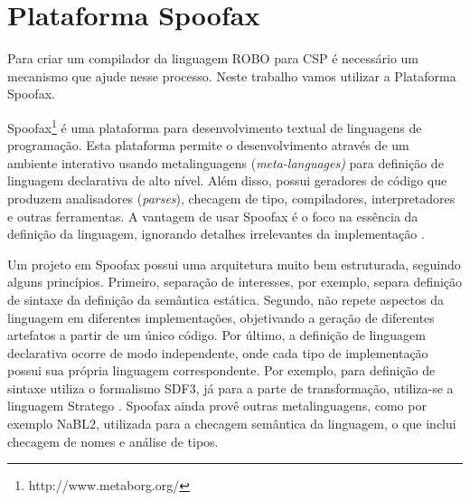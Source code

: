 


\section{Plataforma Spoofax}
\label{sec:compilacao}

Para criar um compilador da linguagem ROBO para CSP é necessário um mecanismo que ajude nesse processo. Neste trabalho vamos utilizar a Plataforma Spoofax.

Spoofax\footnote[6]{http://www.metaborg.org/} é uma plataforma para desenvolvimento textual de linguagens de programação. Esta plataforma permite o desenvolvimento através de um ambiente interativo usando metalinguagens (\textit{meta-languages)} para definição de linguagem declarativa de alto nível. Além disso, possui geradores de código que produzem analisadores (\textit{parses}), checagem de tipo, compiladores, interpretadores e outras ferramentas. A vantagem de usar Spoofax é o foco na essência da definição da linguagem, ignorando detalhes irrelevantes da implementação \cite{KatsSpoofax}.

Um projeto em Spoofax possui uma arquitetura muito bem estruturada, seguindo alguns princípios. Primeiro, separação de interesses, por exemplo, separa definição de sintaxe da definição da semântica estática. Segundo, não repete aspectos da linguagem em diferentes implementações, objetivando a geração de diferentes artefatos a partir de um único código. Por último, a definição de linguagem declarativa ocorre de modo independente, onde cada tipo de implementação possui sua própria linguagem correspondente. Por exemplo, para definição de sintaxe utiliza o formalismo SDF3, já para a parte de transformação, utiliza-se a linguagem Stratego \cite{KatsSpoofax}. Spoofax ainda provê outras metalinguagens, como por exemplo NaBL2, utilizada para a checagem semântica da linguagem, o que inclui checagem de nomes e análise de tipos. 

